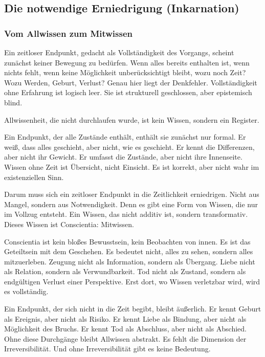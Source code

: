 \documentclass[
  ngerman,
]{article}
\begin{document}
\subsection{\texorpdfstring{\textbf{Die notwendige Erniedrigung
(Inkarnation)}}{Die notwendige Erniedrigung (Inkarnation)}}\label{die-notwendige-erniedrigung-inkarnation}

\subsubsection{\texorpdfstring{\textbf{Vom Allwissen zum
Mitwissen}}{Vom Allwissen zum Mitwissen}}\label{vom-allwissen-zum-mitwissen}

Ein zeitloser Endpunkt, gedacht als Vollständigkeit des Vorgangs,
scheint zunächst keiner Bewegung zu bedürfen. Wenn alles bereits
enthalten ist, wenn nichts fehlt, wenn keine Möglichkeit
unberücksichtigt bleibt, wozu noch Zeit? Wozu Werden, Geburt, Verlust?
Genau hier liegt der Denkfehler. Vollständigkeit ohne Erfahrung ist
logisch leer. Sie ist strukturell geschlossen, aber epistemisch blind.

Allwissenheit, die nicht durchlaufen wurde, ist kein Wissen, sondern ein
Register.

Ein Endpunkt, der alle Zustände enthält, enthält sie zunächst nur
formal. Er weiß, dass alles geschieht, aber nicht, wie es geschieht. Er
kennt die Differenzen, aber nicht ihr Gewicht. Er umfasst die Zustände,
aber nicht ihre Innenseite. Wissen ohne Zeit ist Übersicht, nicht
Einsicht. Es ist korrekt, aber nicht wahr im existenziellen Sinn.

Darum muss sich ein zeitloser Endpunkt in die Zeitlichkeit erniedrigen.
Nicht aus Mangel, sondern aus Notwendigkeit. Denn es gibt eine Form von
Wissen, die nur im Vollzug entsteht. Ein Wissen, das nicht additiv ist,
sondern transformativ. Dieses Wissen ist Conscientia: Mitwissen.

Conscientia ist kein bloßes Bewusstsein, kein Beobachten von innen. Es
ist das Geteiltsein mit dem Geschehen. Es bedeutet nicht, alles zu
sehen, sondern alles mitzuerleben. Zeugung nicht als Information,
sondern als Übergang. Liebe nicht als Relation, sondern als
Verwundbarkeit. Tod nicht als Zustand, sondern als endgültigen Verlust
einer Perspektive. Erst dort, wo Wissen verletzbar wird, wird es
vollständig.

Ein Endpunkt, der sich nicht in die Zeit begibt, bleibt äußerlich. Er
kennt Geburt als Ereignis, aber nicht als Risiko. Er kennt Liebe als
Bindung, aber nicht als Möglichkeit des Bruchs. Er kennt Tod als
Abschluss, aber nicht als Abschied. Ohne diese Durchgänge bleibt
Allwissen abstrakt. Es fehlt die Dimension der Irreversibilität. Und
ohne Irreversibilität gibt es keine Bedeutung.
\end{document}
